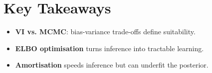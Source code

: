 
\section*{Key Takeaways}

\begin{keytakeaways}
\begin{itemize}[leftmargin=2em]
    \item \textbf{VI vs. MCMC}: bias-variance trade-offs define suitability.
    \item \textbf{ELBO optimisation} turns inference into tractable learning.
    \item \textbf{Amortisation} speeds inference but can underfit the posterior.
\end{itemize}
\end{keytakeaways}


